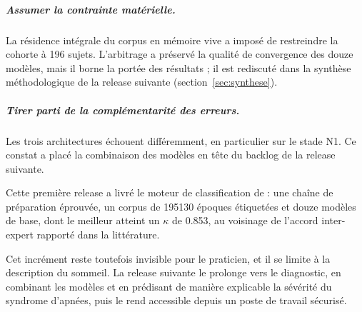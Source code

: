 \subparagraph{Assumer la contrainte matérielle.} La résidence intégrale du corpus en
mémoire vive a imposé de restreindre la cohorte à 196 sujets. L'arbitrage a préservé la
qualité de convergence des douze modèles, mais il borne la portée des résultats ; il est
rediscuté dans la synthèse méthodologique de la release suivante
(section~\ref{sec:synthese}).

\subparagraph{Tirer parti de la complémentarité des erreurs.} Les trois architectures
échouent différemment, en particulier sur le stade N1. Ce constat a placé la combinaison
des modèles en tête du backlog de la release suivante.


Cette première release a livré le moteur de classification de \hypnoria{} : une chaîne de
préparation éprouvée, un corpus de \num{195130} époques étiquetées et douze modèles de base,
dont le meilleur atteint un $\kappa$ de \num{0,853}, au voisinage de l'accord inter-expert
rapporté dans la littérature.

Cet incrément reste toutefois invisible pour le praticien, et il se limite à la description
du sommeil. La release suivante le prolonge vers le diagnostic, en combinant les modèles
et en prédisant de manière explicable la sévérité du syndrome d'apnées, puis le rend
accessible depuis un poste de travail sécurisé.
